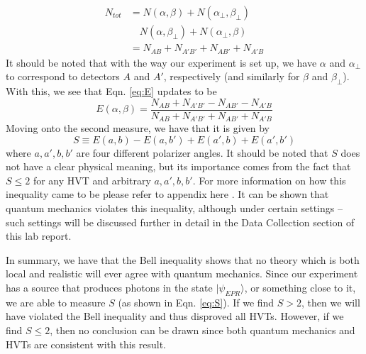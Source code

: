 \documentclass[twocolumn,amsmath,amssymb,pra]{revtex4-2}
\begin{document}
\begin{equation}
    \begin{aligned}
        N_{tot}
        &=
        N(\alpha, \beta) + N(\alpha_{\perp}, \beta_{\perp})
        \\
        &\quad 
        N(\alpha, \beta_{\perp}) + N(\alpha_{\perp}, \beta)
        \\
        &=
        N_{AB} + N_{A'B'} + N_{A B'} + N_{A'B}
    \end{aligned}
\end{equation}
It should be noted that with the way our experiment is set up, we have $\alpha$ and $\alpha_{\perp}$ to correspond to detectors $A$ and $A'$, respectively (and similarly for $\beta$ and $\beta_{\perp}$).
With this, we see that Eqn. \ref{eq:E} updates to be 
\begin{equation}
    E(\alpha, \beta)
    =
    \frac{N_{AB} + N_{A'B'} - N_{A B'} - N_{A'B}}{N_{AB} + N_{A'B'} + N_{A B'} + N_{A'B}}
\label{eq:E_num}
\end{equation}
Moving onto the second measure, we have that it is given by
\begin{equation}
    S 
    \equiv 
    E(a, b) - E(a, b') + E(a', b) + E(a', b')
    \label{eq:S}
\end{equation}
where $a, a', b, b'$ are four different polarizer angles. It should be noted that $S$ does not have a clear physical meaning, but its importance comes from the fact that $S \leq 2$ for any HVT and arbitrary $a, a',b, b'$. For more information on how this inequality came to be please refer to appendix here \cite{D_M}. It can be shown that quantum mechanics violates this inequality, although under certain settings -- such settings will be discussed further in detail in the Data Collection section of this lab report.

In summary, we have that the Bell inequality shows that no theory which is both local and realistic will ever agree with quantum mechanics. Since our experiment has a source that produces photons in the state $\vert \psi_{EPR} \rangle$, or something close to it, we are able to measure $S$ (as shown in Eqn. \ref{eq:S}). If we find $S > 2$, then we will have violated the Bell inequality and thus disproved all HVTs. However, if we find $S \leq 2$, then no conclusion can be drawn since both quantum mechanics and HVTs are consistent with this result.
\end{document}
